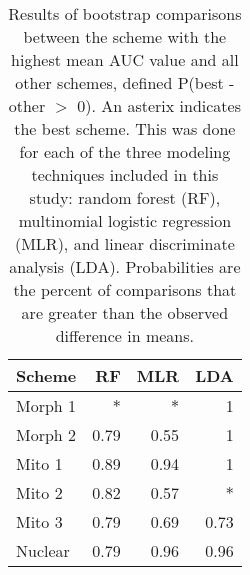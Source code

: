 \documentclass{article}
\begin{document}
\begin{table}
  \centering
  \caption{Results of bootstrap comparisons between the scheme with the highest mean AUC value and all other schemes, defined P(best - other \(>\) 0). An asterix indicates the best scheme. This was done for each of the three modeling techniques included in this study: random forest (RF), multinomial logistic regression (MLR), and linear discriminate analysis (LDA). Probabilities are the percent of comparisons that are greater than the observed difference in means.}
  \begin{tabular}{ l r r r }
    \hline
    Scheme & RF & MLR & LDA \\
    \hline
    \hline
    Morph 1 & \(\ast\) & \(\ast\) & 1 \\
    Morph 2 & 0.79 & 0.55 & 1 \\
    Mito 1 & 0.89 & 0.94 & 1 \\ 
    Mito 2 & 0.82 & 0.57 & \(\ast\) \\ 
    Mito 3 & 0.79 & 0.69 & 0.73 \\ 
    Nuclear & 0.79 & 0.96 & 0.96 \\ 
    \hline
  \end{tabular}
  \label{tab:gen_tests}
\end{table}
\end{document}
